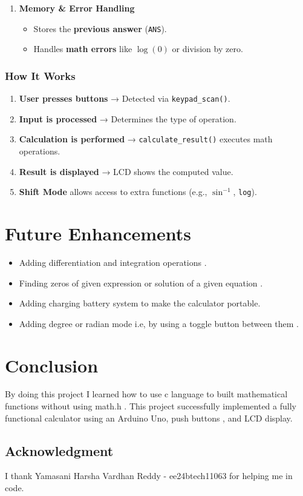 \documentclass{article}
\begin{document}
\begin{enumerate}
    \item \textbf{Memory \& Error Handling}
    \begin{itemize}
        \item Stores the \textbf{previous answer} (\texttt{ANS}).
        \item Handles \textbf{math errors} like \(\log(0)\) or division by zero.
    \end{itemize}
\end{enumerate}

\subsubsection{\textbf{\textrm{ How It Works}}}
\begin{enumerate}
    \item \textbf{User presses buttons} → Detected via \texttt{keypad\_scan()}.
    \item \textbf{Input is processed} → Determines the type of operation.
    \item \textbf{Calculation is performed} → \texttt{calculate\_result()} executes math operations.
    \item \textbf{Result is displayed} → LCD shows the computed value.
    \item \textbf{Shift Mode} allows access to extra functions (e.g., \(\sin^{-1}\), \texttt{log}).
\end{enumerate}


\section{Future Enhancements}
\begin{itemize}
\item Adding differentiation and integration operations . 
\item Finding zeros of given expression or  solution of a given equation .
\item Adding charging battery system to make the calculator portable.
\item Adding degree or radian mode i.e, by using a toggle button between them .
\end{itemize}

\section{Conclusion}

By doing this project I learned how to use c language to built mathematical functions without using math.h . This project successfully implemented a fully functional calculator using an Arduino Uno, push buttons , and LCD display.


\subsection*{Acknowledgment} 
I thank Yamasani Harsha Vardhan Reddy - ee24btech11063 for helping me in code.
\end{document}
